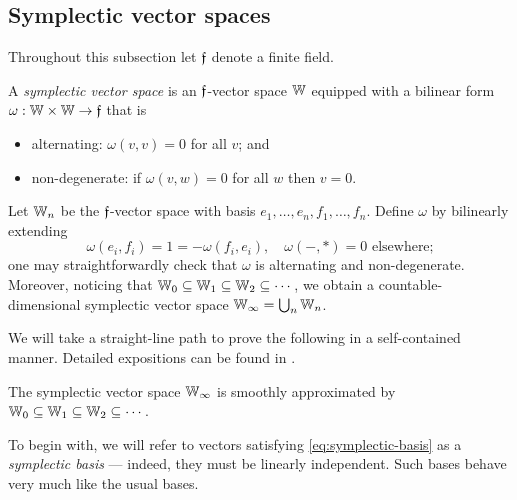 \subsection{Symplectic vector spaces}
Throughout this subsection let $\mathfrak{f}$ denote a finite field.
\begin{definition}
    A \emph{symplectic vector space} is an $\mathfrak{f}$-vector space $\mathbb{W}$ 
    equipped with a bilinear form $\omega: \mathbb{W} \times \mathbb{W} \to \mathfrak{f}$ that is
    \begin{itemize}
        \item alternating: $\omega(v, v) = 0$ for all $v$; and
        \item non-degenerate: if $\omega(v, w) = 0$ for all $w$ then $v = 0$.
    \end{itemize}
\end{definition}

\begin{example}
    Let $\mathbb{W}_n$ be the $\mathfrak{f}$-vector space with basis $e_1  , \ldots, e_n, f_1, \ldots, f_n$.
    Define $\omega$ by bilinearly extending
    \begin{equation}\label{eq:symplectic-basis}
        \omega(e_i, f_i) = 1 = -\omega(f_i, e_i),\quad
        \omega(-, *) = 0 \text{ elsewhere;}
        \tag{\S}
    \end{equation}
    one may straightforwardly check that $\omega$ is alternating and non-degenerate.
    Moreover, noticing that $\mathbb{W}_0 \subseteq \mathbb{W}_1 \subseteq \mathbb{W}_2 \subseteq \cdots$,
    we obtain a countable-dimensional symplectic vector space $\mathbb{W}_\infty = \bigcup_n \mathbb{W}_n$.
\end{example}

We will take a straight-line path to prove the following in a self-contained manner.
Detailed expositions can be found in \cite[{\S}III.3]{Ar57}.
\begin{theorem}\label{thm:symplectic-smooth-approximation}
    The symplectic vector space $\mathbb{W}_\infty$ is smoothly approximated by 
    $\mathbb{W}_0 \subseteq \mathbb{W}_1 \subseteq \mathbb{W}_2 \subseteq \cdots$.
\end{theorem}

To begin with, we will refer to vectors satisfying \eqref{eq:symplectic-basis} as a \emph{symplectic basis} 
--- indeed, they must be linearly independent.
Such bases behave very much like the usual bases.

